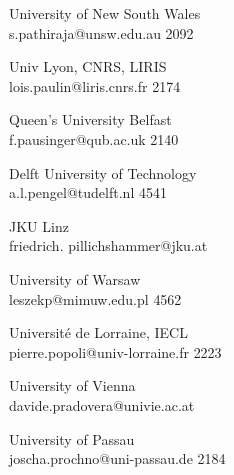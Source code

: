 \begin{multicols}{2}
 {University of New South Wales\\}%
 {s.pathiraja@unsw.edu.au}%
 {2092} %
 {} %
 {} %
 {} %
 {} %

 {Univ Lyon, CNRS, LIRIS\\}%
 {lois.paulin@liris.cnrs.fr}%
 {2174} %
 {} %
 {} %
 {} %
 {} %

 {Queen's University Belfast\\}%
 {f.pausinger@qub.ac.uk}%
 {2140} %
 {} %
 {} %
 {} %
 {} %

 {Delft University of Technology\\}%
 {a.l.pengel@tudelft.nl}%
 {4541} %
 {} %
 {} %
 {} %
 {} %

 {JKU Linz\\}%
 {friedrich. pillichshammer@jku.at}%
 {} %
 {} %
 {} %
 {} %
 {} %

 {University of Warsaw\\}%
 {leszekp@mimuw.edu.pl}%
 {4562} %
 {} %
 {} %
 {} %
 {} %

 {Universit\'{e} de Lorraine, IECL\\}%
 {pierre.popoli@univ-lorraine.fr}%
 {2223} %
 {} %
 {} %
 {} %
 {} %

 {University of Vienna\\}%
 {davide.pradovera@univie.ac.at}%
 {} %
 {} %
 {} %
 {} %
 {} %

 {University of Passau\\}%
 {joscha.prochno@uni-passau.de}%
 {2184} %
 {} %
 {} %
 {} %
 {} %


\end{multicols}
